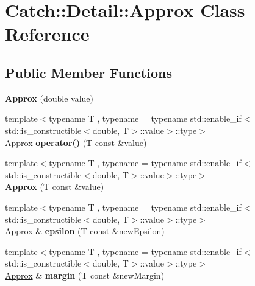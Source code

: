 \hypertarget{class_catch_1_1_detail_1_1_approx}{}\section{Catch\+:\+:Detail\+:\+:Approx Class Reference}
\label{class_catch_1_1_detail_1_1_approx}
\subsection*{Public Member Functions}
\begin{DoxyCompactItemize}
\item 
\mbox{\label{class_catch_1_1_detail_1_1_approx_a1a8618ea8db08c66bd3d9fe8f74b957a}} 
{\bfseries Approx} (double value)
\item 
\mbox{\label{class_catch_1_1_detail_1_1_approx_ad8b2757f4804f9a1d3fa674efb98c20e}} 
{\footnotesize template$<$typename T , typename  = typename std\+::enable\+\_\+if$<$std\+::is\+\_\+constructible$<$double, T$>$\+::value$>$\+::type$>$ }\\\mbox{\hyperlink{class_catch_1_1_detail_1_1_approx}{Approx}} {\bfseries operator()} (T const \&value)
\item 
\mbox{\label{class_catch_1_1_detail_1_1_approx_ab14b979fa8a37f21d037157fabed4072}} 
{\footnotesize template$<$typename T , typename  = typename std\+::enable\+\_\+if$<$std\+::is\+\_\+constructible$<$double, T$>$\+::value$>$\+::type$>$ }\\{\bfseries Approx} (T const \&value)
\item 
\mbox{\label{class_catch_1_1_detail_1_1_approx_acd26adba86a066b9f40dad467f23bc85}} 
{\footnotesize template$<$typename T , typename  = typename std\+::enable\+\_\+if$<$std\+::is\+\_\+constructible$<$double, T$>$\+::value$>$\+::type$>$ }\\\mbox{\hyperlink{class_catch_1_1_detail_1_1_approx}{Approx}} \& {\bfseries epsilon} (T const \&new\+Epsilon)
\item 
\mbox{\label{class_catch_1_1_detail_1_1_approx_a6467dc18791e1a1f4c15c4fb63cf5051}} 
{\footnotesize template$<$typename T , typename  = typename std\+::enable\+\_\+if$<$std\+::is\+\_\+constructible$<$double, T$>$\+::value$>$\+::type$>$ }\\\mbox{\hyperlink{class_catch_1_1_detail_1_1_approx}{Approx}} \& {\bfseries margin} (T const \&new\+Margin)

\end{DoxyCompactItemize}
